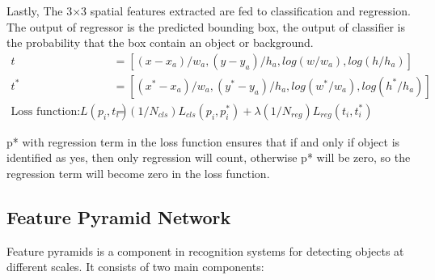    Lastly, The 3×3 spatial features extracted are fed to classification and regression. The output of regressor is the predicted bounding box, the output of classifier is the probability that the box contain an object or background. 
\begin{equation}
    \begin{aligned}
    t &= [(x - x_a)/w_a, (y - y_a)/h_a, log(w/w_a), log(h/h_a)]\\
    t^* &= [(x^* - x_a)/w_a, (y^* - y_a)/h_a, log(w^*/w_a), log(h^*/h_a)]\\
    \text{Loss function:} L({p_i}, {t_i}) &= (1/N_{cls}) L_{cls}(p_i,p_i^*) + \lambda (1/N_{reg}) L_{reg}(t_i,t_i^*)
    \end{aligned}
\end{equation}
        
    
    p* with regression term in the loss function ensures that if and only if object is identified as yes, then only regression will count, otherwise p* will be zero, so the regression term will become zero in the loss function.
    
\subsection{Feature Pyramid Network}
Feature pyramids is a component in recognition systems for detecting objects at different scales. It consists of two main components:

